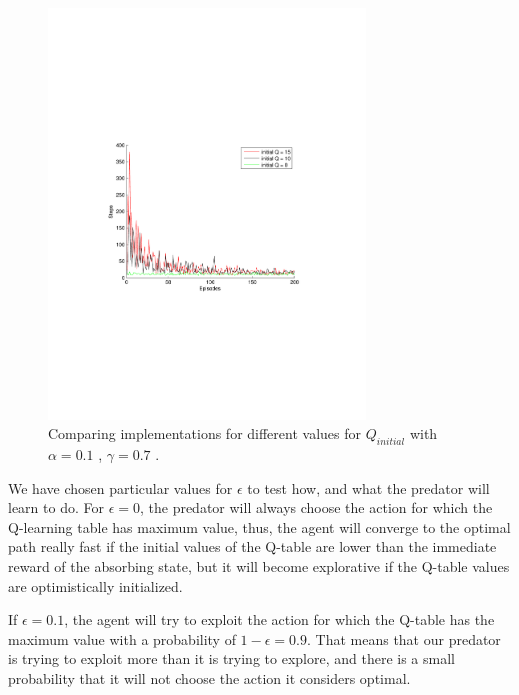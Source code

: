 \documentclass[a4paper,11pt]{article}
\begin{document}
\begin{figure}[t!]
  \centering
    \includegraphics[trim=4cm 8.5cm 4cm 8.5cm,clip,width=0.75\textwidth]{figures/qcomp.pdf}
    \caption{Comparing implementations for different values for $Q_{initial}$  with $\alpha = 0.1$ , $\gamma=0.7$ .}
    \label{qcomp}
\end{figure}



We have chosen particular values for $\epsilon$ to test how, and what the predator will learn to do. For $\epsilon = 0$, the predator will always choose the action for which the Q-learning table has maximum value, thus, the agent will converge to the optimal path really fast if the initial values of the Q-table are lower than the immediate reward of the absorbing state, but it will become explorative if the Q-table values are optimistically initialized.


If $\epsilon = 0.1$, the agent will try to exploit the action for which the Q-table has the maximum value with a probability of $1-\epsilon = 0.9$. That means that our predator is trying to exploit more than it is trying to explore, and there is a small probability that it will not choose the action it considers optimal.
\end{document}

